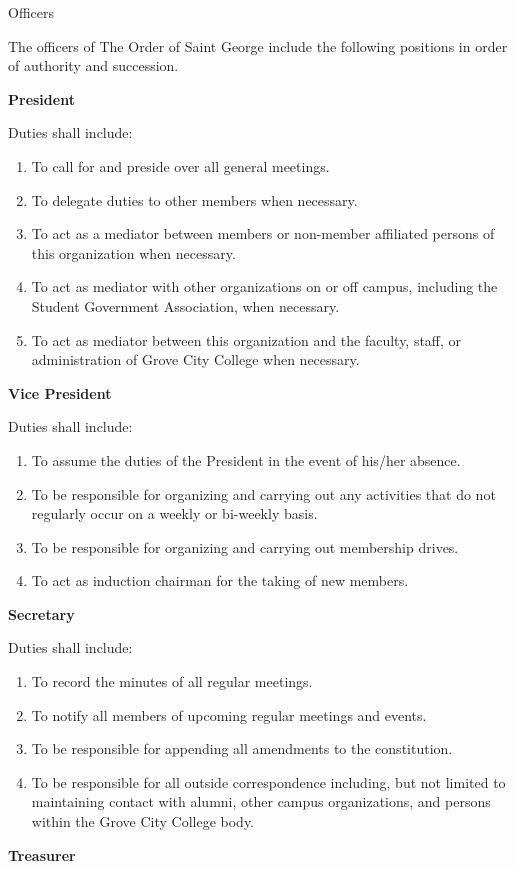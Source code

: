 {
\begin{article}{Officers}
	\item The officers of The Order of Saint George include the following positions in order of authority and succession.

	\item \textbf{President}

	Duties shall include:
	\begin{enumerate}
		\item To call for and preside over all general meetings.
		\item To delegate duties to other members when necessary.
		\item To act as a mediator between members or non-member affiliated persons of this organization when necessary.
		\item To act as mediator with other organizations on or off campus, including the Student Government Association, when necessary.
		\item To act as mediator between this organization and the faculty, staff, or administration of Grove City College when necessary.
	\end{enumerate}
	\item \textbf{Vice President}

	Duties shall include:
	\begin{enumerate}
		\item To assume the duties of the President in the event of his/her absence.
		\item To be responsible for organizing and carrying out any activities that do not regularly occur on a weekly or bi-weekly basis.
		\item To be responsible for organizing and carrying out membership drives.
		\item To act as induction chairman for the taking of new members.
	\end{enumerate}
	\item \textbf{Secretary}

	Duties shall include:
	\begin{enumerate}
		\item To record the minutes of all regular meetings.
		\item To notify all members of upcoming regular meetings and events.
		\item To be responsible for appending all amendments to the constitution.
		\item To be responsible for all outside correspondence including, but not limited to maintaining contact with alumni, other campus organizations, and persons within the Grove City College body.
	\end{enumerate}
	\item \textbf{Treasurer}


\end{article}}
